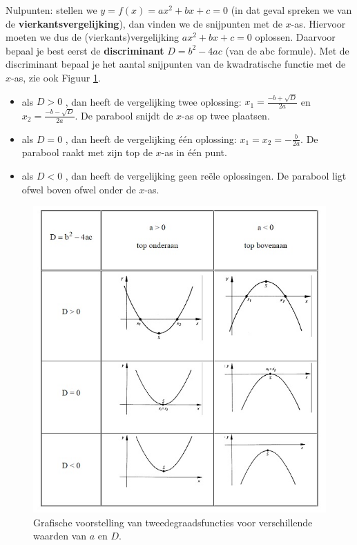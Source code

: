 Nulpunten: stellen we $y=f(x)=ax^{2}+bx+c=0$
(in dat geval spreken we van de \textbf{vierkantsvergelijking}), dan
vinden we de snijpunten met de $x$-as. Hiervoor moeten we dus de
(vierkants)vergelijking $ax^{2}+bx+c=0$ oplossen. Daarvoor bepaal
je best eerst de \textbf{discriminant} $D=b^{2}-4ac$ (van de abc
formule). Met de discriminant bepaal je het aantal snijpunten van
de kwadratische functie met de $x$-as, zie ook Figuur \ref{fig:tweede:gevallen}.
\begin{itemize}
\item als $D>0$ , dan heeft de vergelijking twee oplossing: $x_{1}=\frac{-b+\sqrt{D}}{2a}$
en $x_{2}=\frac{-b-\sqrt{D}}{2a}$. De parabool snijdt de $x$-as
op twee plaatsen.
\item als $D=0$ , dan heeft de vergelijking \'e\'en oplossing: $x_{1}=x_{2}=-\frac{b}{2a}$.
De parabool raakt met zijn top de $x$-as in \'e\'en punt.
\item als $D<0$ , dan heeft de vergelijking geen re\"ele oplossingen. De
parabool ligt ofwel boven ofwel onder de $x$-as.
\end{itemize}
\begin{figure}[h]
\centering{}\includegraphics[scale=0.5]{2_elem_rekenvaardigheden_B/inputs/tweedegraadsfuncties2.jpg} 
\caption{Grafische voorstelling van tweedegraadsfuncties voor verschillende waarden van $a$ en $D$.}
\label{fig:tweede:gevallen}
\end{figure}


